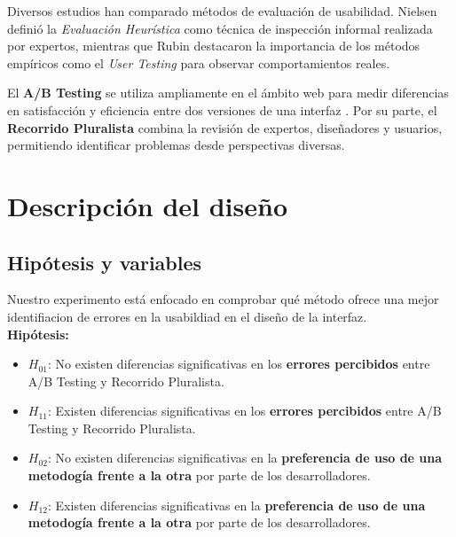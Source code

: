 \documentclass[a4paper,12pt]{report}
\begin{document}
Diversos estudios han comparado métodos de evaluación de usabilidad. Nielsen \cite{nielsen1994usability} definió la \textit{Evaluación Heurística} como técnica de inspección informal realizada por expertos, mientras que Rubin \cite{rubin2011handbook} destacaron la importancia de los métodos empíricos como el \textit{User Testing} para observar comportamientos reales.  

El \textbf{A/B Testing} se utiliza ampliamente en el ámbito web para medir diferencias en satisfacción y eficiencia entre dos versiones de una interfaz \cite{kohavi2009controlled}. Por su parte, el \textbf{Recorrido Pluralista} \cite{biasPluralistic} combina la revisión de expertos, diseñadores y usuarios, permitiendo identificar problemas desde perspectivas diversas.


\chapter{Descripción del diseño}

\section{Hipótesis y variables}

Nuestro experimento está enfocado en comprobar qué método ofrece una mejor identifiacion de errores en la usabildiad en el diseño de la interfaz. \\
\vspace{0.1cm}
\textbf{Hipótesis:}
\begin{itemize}
    \item $H_{01}$: No existen diferencias significativas en los \textbf{errores percibidos} entre A/B Testing y Recorrido Pluralista.  
    \item $H_{11}$: Existen diferencias significativas en los \textbf{errores percibidos} entre A/B Testing y Recorrido Pluralista.
        \item $H_{02}$: No existen diferencias significativas en la \textbf{preferencia de uso de una metodogía frente a la otra} por parte de los desarrolladores.  
    \item $H_{12}$: Existen diferencias significativas en la \textbf{preferencia de uso de una metodogía frente a la otra} por parte de los desarrolladores.
\end{itemize}
\end{document}
